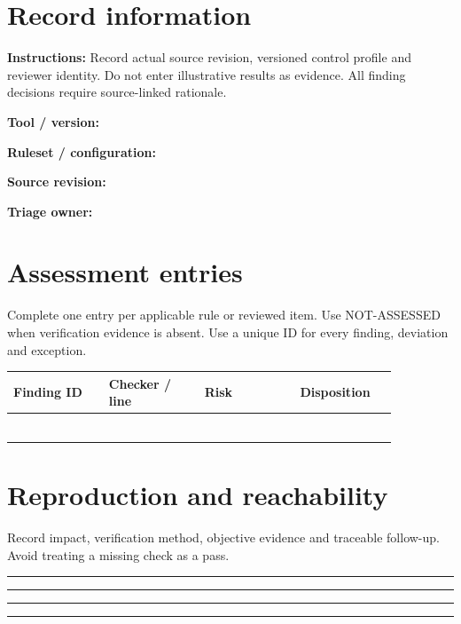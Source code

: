 \documentclass[10pt,letterpaper]{article}
\begin{document}
\makedoctitle
\makedocsummary
\section{Record information}
\textbf{Instructions:} Record actual source revision, versioned control profile and reviewer identity. Do not enter illustrative results as evidence. All finding decisions require source-linked rationale.\par\medskip
\noindent\textbf{Tool / version:}\quad\hrulefill\par\vspace{11pt}
\noindent\textbf{Ruleset / configuration:}\quad\hrulefill\par\vspace{11pt}
\noindent\textbf{Source revision:}\quad\hrulefill\par\vspace{11pt}
\noindent\textbf{Triage owner:}\quad\hrulefill\par\vspace{11pt}
\section{Assessment entries}
Complete one entry per applicable rule or reviewed item. Use NOT-ASSESSED when verification evidence is absent. Use a unique ID for every finding, deviation and exception.\par\medskip
\begin{longtable}{|p{0.215\linewidth}|p{0.215\linewidth}|p{0.215\linewidth}|p{0.215\linewidth}|}
\hline
\textbf{Finding ID} & \textbf{Checker / line} & \textbf{Risk} & \textbf{Disposition}\\\hline
\endhead
\rule{0pt}{27pt} & & & \\\hline
\rule{0pt}{27pt} & & & \\\hline
\rule{0pt}{27pt} & & & \\\hline
\rule{0pt}{27pt} & & & \\\hline
\rule{0pt}{27pt} & & & \\\hline
\rule{0pt}{27pt} & & & \\\hline
\end{longtable}
\section{Reproduction and reachability}
Record impact, verification method, objective evidence and traceable follow-up. Avoid treating a missing check as a pass.\par\medskip
\noindent\rule{\linewidth}{0.4pt}\par\vspace{16pt}
\noindent\rule{\linewidth}{0.4pt}\par\vspace{16pt}
\noindent\rule{\linewidth}{0.4pt}\par\vspace{16pt}
\noindent\rule{\linewidth}{0.4pt}\par\vspace{16pt}
\end{document}
